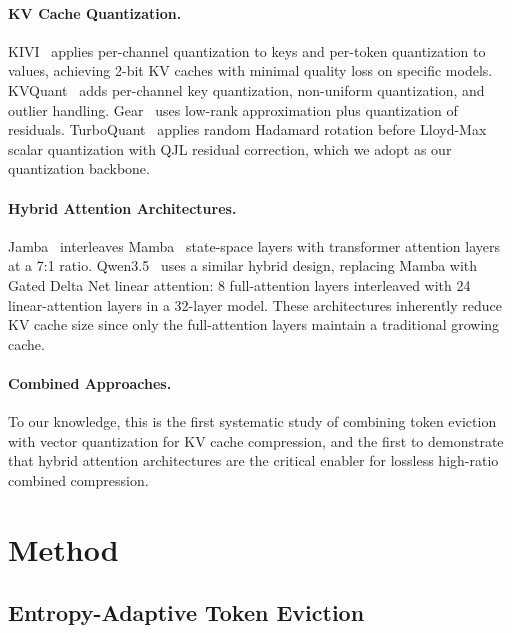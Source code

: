 \documentclass[11pt]{article}
\begin{document}
\paragraph{KV Cache Quantization.}
KIVI~\citep{liu2024kivi} applies per-channel quantization to keys and per-token quantization to values, achieving 2-bit KV caches with minimal quality loss on specific models.  KVQuant~\citep{hooper2024kvquant} adds per-channel key quantization, non-uniform quantization, and outlier handling.  Gear~\citep{kang2024gear} uses low-rank approximation plus quantization of residuals.  TurboQuant~\citep{duanmu2024turboquant} applies random Hadamard rotation before Lloyd-Max scalar quantization with QJL residual correction, which we adopt as our quantization backbone.

\paragraph{Hybrid Attention Architectures.}
Jamba~\citep{lieber2024jamba} interleaves Mamba~\citep{gu2024mamba} state-space layers with transformer attention layers at a 7:1 ratio.  Qwen3.5~\citep{qwen2025qwen3} uses a similar hybrid design, replacing Mamba with Gated Delta Net linear attention: 8 full-attention layers interleaved with 24 linear-attention layers in a 32-layer model.  These architectures inherently reduce KV cache size since only the full-attention layers maintain a traditional growing cache.

\paragraph{Combined Approaches.}
To our knowledge, this is the first systematic study of combining token eviction with vector quantization for KV cache compression, and the first to demonstrate that hybrid attention architectures are the critical enabler for lossless high-ratio combined compression.

\section{Method}
\label{sec:method}

\subsection{Entropy-Adaptive Token Eviction}
\label{sec:eviction}
\end{document}
